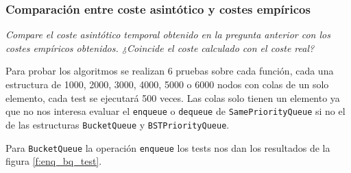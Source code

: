 \documentclass[a4paper, 12pt]{article}
\begin{document}
            \subsubsection{Comparación entre coste asintótico y costes empíricos}

                \textit{Compare el coste asintótico temporal obtenido en la 
                pregunta anterior con los costes empíricos obtenidos. ¿Coincide
                el coste calculado con el coste real?}
                \\\mbox{}

                Para probar los algoritmos se realizan 6 pruebas sobre cada 
                función, cada una estructura de 1000, 2000, 3000, 4000, 5000 o 
                6000 nodos con colas de un solo elemento, cada test se ejecutará
                500 veces. Las colas solo tienen un elemento ya que no nos 
                interesa evaluar el \texttt{enqueue} o \texttt{dequeue} de 
                \texttt{SamePriorityQueue} si no el de las estructuras 
                \texttt{BucketQueue} y \texttt{BSTPriorityQueue}. \\\mbox{}
                
                Para \texttt{BucketQueue} la operación \texttt{enqueue} los
                tests nos dan los resultados de la figura \ref{f:enq_bq_test}.
                \\\mbox{}
\end{document}
